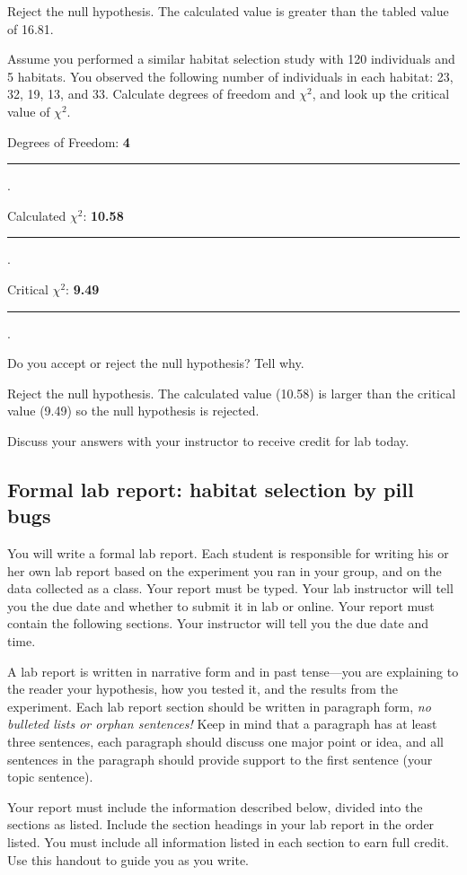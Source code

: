 \documentclass[12pt, hidelinks]{exam}
\newcommand*\AnswerBox[2]{%
    \parbox[t][#1]{0.92\textwidth}{%
    \begin{solution}#2\end{solution}}
    \vspace{\stretch{1}}
}
\newlength{\basespace}
\newcommand\chisq{$\chi^2$}
\newcommand*\AnswerBlank[1]{%
	\ifprintanswers%
		\textbf{#1}
	\else%
		\rule{0.75in}{0.4pt}\kern0.67pt.\fi%
	}
\begin{document}
\begin{questions}
	\AnswerBox{2\basespace}{Reject the null hypothesis. The calculated value is greater than the tabled value of 16.81.}

	\question[Checkout]
	Assume you performed a similar habitat selection study with 120 individuals and 5 habitats. You observed the following number of individuals in each habitat: 23, 32, 19, 13, and 33. Calculate degrees of freedom and \chisq{}, and look up the critical value of \chisq{}.\bigskip
	
	Degrees of Freedom: \AnswerBlank{4} \bigskip 
	
	Calculated \chisq{}: \AnswerBlank{10.58} \bigskip
	
	Critical \chisq{}: \AnswerBlank{9.49}
	
	\question[Checkout]
	Do you accept or reject the null hypothesis?  Tell why.
	
	\AnswerBox{\basespace}{%
		Reject the null hypothesis. The calculated value (10.58) is larger than the critical value (9.49) so the null hypothesis is rejected.
	}
		
	Discuss your answers with your instructor to receive credit for lab today.
	
\end{questions}
	

\subsection*{Formal lab report: habitat selection by pill bugs}

You will write a formal lab report. Each student is responsible for writing his or her own lab report based on
the experiment you ran in your group, and on the data collected as a
class. Your report must be typed. Your lab instructor will tell you the due date and whether to submit it in lab or online. Your report must contain the following sections. Your instructor will tell you the due date and time.
 
A lab report is written in narrative form and in past tense—you are
explaining to the reader your hypothesis, how you tested it, and the
results from the experiment. Each lab report section should be written
in paragraph form, \emph{no bulleted lists or orphan sentences!} Keep in
mind that a paragraph has at least three sentences, each paragraph should
discuss one major point or idea, and all sentences in the paragraph
should provide support to the first sentence (your topic sentence).

Your report must include the information described below, divided into the
sections as listed. Include the section headings in your lab report in the order listed. You must 
include all information listed in each section to earn full credit. 
Use this handout to guide you as you write.
\end{document}
